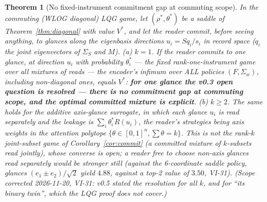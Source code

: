 \documentclass[11pt]{article}
\newtheorem{theorem}{Theorem}
\theoremstyle{definition}
\begin{document}
\begin{theorem}[No fixed-instrument commitment gap at commuting
scope]\label{thm:nogap}
In the commuting (WLOG diagonal) LQG game, let $(\rho^\ast,
\theta^\ast)$ be a saddle of Theorem~\ref{thm:diagonal} with value
$V^\ast$, and let the reader commit, before seeing anything, to
glances along the eigenbasis directions $u_i=Sq_i/s_i$ in record space
($q_i$ the joint eigenvectors of $\Sigma_S$ and $M$).
\emph{(a) $k=1$.} If the reader commits to one glance, at direction
$u_i$ with probability $\theta^\ast_i$ --- the fixed rank-one-instrument
game over all mixtures of reads --- the encoder's infimum over ALL
policies $(F,\Sigma_w)$, including non-diagonal ones, equals $V^\ast$:
\textbf{for one glance the v0.3 open question is resolved --- there is
no commitment gap at commuting scope, and the optimal committed mixture
is explicit}.
\emph{(b) $k\ge2$.} The same holds for the \emph{additive axis-glance
surrogate}, in which each glance $u_i$ is read separately and the
leakage is $\sum_i\theta^\ast_iR(u_i)$, the reader's strategies being
axis weights in the attention polytope $\{\theta\in[0,1]^n,\sum\theta=k\}$.
This is not the rank-$k$ joint-subset game of Corollary~\ref{cor:commit}
(a committed mixture of $k$-subsets read jointly), whose converse is
open; a reader free to choose non-axis glances read separately would be
stronger still (against the 6-coordinate saddle policy, glances
$(e_1\pm e_2)/\sqrt2$ yield $4.88$, against a top-2 value of $3.50$, VI-31).
(Scope corrected 2026-11-20, VI-31: v0.5 stated the resolution for all
$k$, and for ``its binary twin'', which the LQG proof does not cover.)
\end{theorem}
\end{document}
